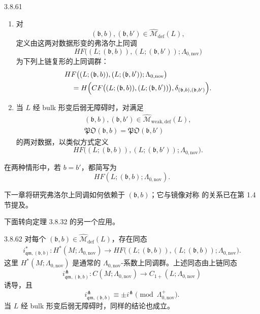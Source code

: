 \begin{definition}{3.8.61}\label{def:3-8-61}
\begin{enumerate}[label=\textup{(\arabic*)},leftmargin=2.8em]
\item 对
\[
 (\mathfrak b,b),(\mathfrak b,b')
 \in\widehat{\mathcal M}_{\mathrm{def}}(L),
\]
定义由这两对数据形变的弗洛尔上同调
\[
 HF\bigl(
 (L;(\mathfrak b,b)),(L;(\mathfrak b,b'));
 \Lambda_{0,\mathrm{nov}}
 \bigr)
\]
为下列上链复形的上同调群：
\[
\begin{aligned}
&HF\bigl(
 (L;(\mathfrak b,b)),(L;(\mathfrak b,b'));
 \Lambda_{0,\mathrm{nov}}
 \bigr)\\
&\quad=
H\Bigl(
 CF\bigl((L;(\mathfrak b,b)),(L;(\mathfrak b,b'))\bigr),
 \delta_{(\mathfrak b,b),(\mathfrak b,b')}
\Bigr).
\end{aligned}
\]
\item 当 $L$ 经 bulk 形变后弱无障碍时，对满足
\[
 \begin{gathered}
 (\mathfrak b,b),(\mathfrak b,b')
 \in\widehat{\mathcal M}_{\mathrm{weak,def}}(L),\\
 \mathfrak{PO}(\mathfrak b,b)
 =
 \mathfrak{PO}(\mathfrak b,b')
 \end{gathered}
\]
的两对数据，以类似方式定义
\[
 HF\bigl(
 (L;(\mathfrak b,b)),(L;(\mathfrak b,b'));
 \Lambda_{0,\mathrm{nov}}
 \bigr).
\]
\end{enumerate}
在两种情形中，若 $b=b'$，都简写为
\[
 HF(L;(\mathfrak b,b);\Lambda_{0,\mathrm{nov}}).
\]
\end{definition}

下一章将研究弗洛尔上同调如何依赖于 $(\mathfrak b,b)$；它与镜像对称
的关系已在第 1.4 节提及。

下面转向定理 3.8.32 的另一个应用。

\begin{theorem}{3.8.62}\label{thm:3-8-62}
对每个
$(\mathfrak b,b)\in\widehat{\mathcal M}_{\mathrm{def}}(L)$，存在同态
\[
\begin{aligned}
 i^*_{\mathfrak{qm},(\mathfrak b,b)}\colon
 H^*(M;\Lambda_{0,\mathrm{nov}})
 \longrightarrow
 HF\bigl(
 (L;(\mathfrak b,b)),(L;(\mathfrak b,b));
 \Lambda_{0,\mathrm{nov}}
 \bigr).
\end{aligned}
\]
这里 $H^*(M;\Lambda_{0,\mathrm{nov}})$ 是通常的
$\Lambda_{0,\mathrm{nov}}$-系数上同调群。上述同态由上链同态
\[
 i^\pitchfork_{\mathfrak{qm},(\mathfrak b,b)}
 \colon
 C(M;\Lambda_{0,\mathrm{nov}})
 \longrightarrow
 C_{1+}(L;\Lambda_{0,\mathrm{nov}})
\]
诱导，且
\begin{equation}
 i^\pitchfork_{\mathfrak{qm},(\mathfrak b,b)}
 \equiv
 \pm i^\pitchfork
 \pmod{\Lambda^+_{0,\mathrm{nov}}}.
\tag{3.8.63}\label{eq:3-8-63}
\end{equation}
当 $L$ 经 bulk 形变后弱无障碍时，同样的结论也成立。
\end{theorem}

